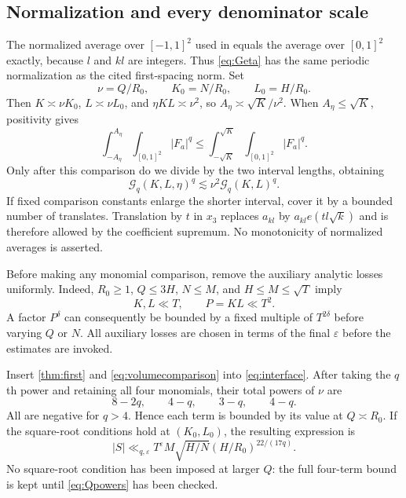 \documentclass[11pt,reqno]{amsart}
\numberwithin{equation}{section}
\theoremstyle{definition}
\theoremstyle{remark}
\newcommand{\eps}{\varepsilon}
\newcommand{\Gq}{\mathcal G_q}
\begin{document}
\subsection{Normalization and every denominator scale}
The normalized average over $[-1,1]^2$ used in \cite{LY} equals the average over $[0,1]^2$ exactly, because $l$ and $kl$ are integers. Thus \eqref{eq:Geta} has the same periodic normalization as the cited first-spacing norm.
Set
\begin{equation}\label{eq:endpointparameters}
 \nu=Q/R_0,\qquad K_0=N/R_0,\qquad L_0=H/R_0.
\end{equation}
Then $K\asymp\nu K_0$, $L\asymp\nu L_0$, and $\eta KL\asymp\nu^2$, so
$A_\eta\asymp\sqrt K/\nu^2$.
When $A_\eta\le\sqrt K$, positivity gives
\[
 \int_{-A_\eta}^{A_\eta}\int_{[0,1]^2}|F_a|^q
 \le\int_{-\sqrt K}^{\sqrt K}\int_{[0,1]^2}|F_a|^q.
\]
Only after this comparison do we divide by the two interval lengths, obtaining
\begin{equation}\label{eq:volumecomparison}
 \Gq(K,L,\eta)^q\lesssim\nu^2\Gq(K,L)^q.
\end{equation}
If fixed comparison constants enlarge the shorter interval, cover it by a bounded number of translates. Translation by $t$ in $x_3$ replaces $a_{kl}$ by $a_{kl}e(tl\sqrt k)$ and is therefore allowed by the coefficient supremum.
No monotonicity of normalized averages is asserted.

Before making any monomial comparison, remove the auxiliary analytic losses uniformly. Indeed, $R_0\ge1$, $Q\le3H$, $N\le M$, and $H\le M\le\sqrt T$ imply
\begin{equation}\label{eq:parameterloss}
 K,L\ll T,\qquad P=KL\ll T^2.
\end{equation}
A factor $P^\delta$ can consequently be bounded by a fixed multiple of $T^{2\delta}$ before varying $Q$ or $N$. All auxiliary losses are chosen in terms of the final $\eps$ before the estimates are invoked.

Insert \cref{thm:first} and \eqref{eq:volumecomparison} into \eqref{eq:interface}. After taking the $q$th power and retaining all four monomials, their total powers of $\nu$ are
\begin{equation}\label{eq:Qpowers}
 8-2q,\qquad4-q,\qquad3-q,\qquad4-q.
\end{equation}
All are negative for $q>4$. Hence each term is bounded by its value at $Q\asymp R_0$.
If the square-root conditions hold at $(K_0,L_0)$, the resulting expression is
\begin{equation}\label{eq:Ssqrt}
 |S|\ll_{q,\eps}T^\eps M\sqrt{H/N}
       (H/R_0)^{22/(17q)}.
\end{equation}
No square-root condition has been imposed at larger $Q$: the full four-term bound is kept until \eqref{eq:Qpowers} has been checked.
\end{document}
